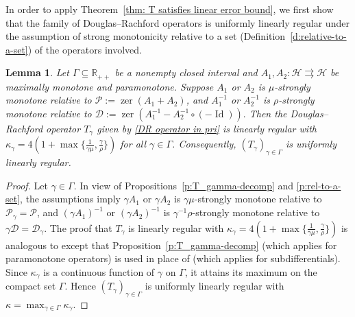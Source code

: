 \documentclass[a4paper,12pt]{article}
\newtheorem{lemma}[theorem]{Lemma}
\DeclareMathOperator{\Id}{Id}
\DeclareMathOperator{\zer}{zer}
\newcommand{\setto}{\rightrightarrows}
\begin{document}
In order to apply Theorem~\ref{thm: T satisfies linear error bound}, we first show that the family of Douglas--Rachford operators is uniformly linearly regular under the assumption of strong monotonicity relative  to a set (Definition~\ref{d:relative-to-a-set}) of the operators involved.
\begin{lemma}\label{lemma: error bound for DR} 
Let $\Gamma\subseteq\mathbb{R}_{++}$ be a nonempty closed interval and $A_1,A_2\colon\mathcal{H}\setto\mathcal{H}$ be maximally monotone and paramonotone. Suppose $A_1$ or $A_2$ is $\mu$-strongly monotone relative to $\mathcal{P}:=\zer(A_1+A_2)$, and $A_1^{-1}$ or $A_2^{-1}$ is $\rho$-strongly monotone relative to $\mathcal{D}:=\zer(A_1^{-1} - A_2^{-1} \circ (- \Id)).$  Then the Douglas--Rachford operator $T_\gamma$ given by \eqref{DR operator in pri} is linearly regular with $\kappa_\gamma=4(1+\max\{\frac{1}{\gamma\mu},\frac{\gamma}{\rho}\})$ for all $\gamma\in\Gamma$. Consequently, $(T_\gamma)_{\gamma\in\Gamma}$ is uniformly linearly regular.
\end{lemma}
\begin{proof}
Let $\gamma\in\Gamma$. In view of Propositions~\ref{p:T_gamma-decomp} and \ref{p:rel-to-a-set}, the assumptions imply $\gamma A_1$ or $\gamma A_2$ is $\gamma\mu$-strongly monotone relative to $\mathcal{P}_\gamma = \mathcal{P}$, and $(\gamma A_1)^{-1}$ or $(\gamma A_2)^{-1}$ is $\gamma^{-1}\rho$-strongly monotone relative to $\gamma\mathcal{D} = \mathcal{D}_\gamma.$ The proof that $T_\gamma$ is linearly regular with $\kappa_\gamma=4(1+\max\{\frac{1}{\gamma\mu},\frac{\gamma}{\rho}\})$ is analogous to \cite[Theorem~2]{pena2021linear} except that  Proposition~\ref{p:T_gamma-decomp} (which applies for paramonotone operators) is used in place of \cite[Proposition~1]{pena2021linear} (which applies for subdifferentials). Since $\kappa_\gamma$  is a continuous function of $\gamma$ on $\Gamma$, it attains its maximum on the compact set $\Gamma$. Hence $(T_\gamma)_{\gamma\in\Gamma}$ is uniformly linearly regular with $\kappa=\max_{\gamma\in\Gamma}\kappa_\gamma$.
\end{proof}
\end{document}
